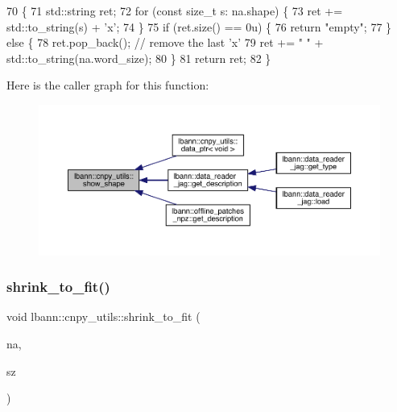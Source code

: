 \begin{DoxyCode}
70                                              \{
71   std::string ret;
72   \textcolor{keywordflow}{for} (\textcolor{keyword}{const} \textcolor{keywordtype}{size\_t} s: na.shape) \{
73     ret += std::to\_string(s) + \textcolor{charliteral}{'x'};
74   \}
75   \textcolor{keywordflow}{if} (ret.size() == 0u) \{
76     \textcolor{keywordflow}{return} \textcolor{stringliteral}{"empty"};
77   \} \textcolor{keywordflow}{else} \{
78     ret.pop\_back(); \textcolor{comment}{// remove the last 'x'}
79     ret += \textcolor{stringliteral}{" "} + std::to\_string(na.word\_size);
80   \}
81   \textcolor{keywordflow}{return} ret;
82 \}
\end{DoxyCode}
Here is the caller graph for this function\+:\nopagebreak
\begin{figure}[H]
\begin{center}
\leavevmode
\includegraphics[width=350pt]{namespacelbann_1_1cnpy__utils_a120e5719167d6d20b2a98c4282fd7a50_icgraph}
\end{center}
\end{figure}
\mbox{\label{namespacelbann_1_1cnpy__utils_ab19ad0a361570b7e78e203c02d6ba13a}} 
\subsubsection{\texorpdfstring{shrink\+\_\+to\+\_\+fit()}{shrink\_to\_fit()}}
{\footnotesize\ttfamily void lbann\+::cnpy\+\_\+utils\+::shrink\+\_\+to\+\_\+fit (\begin{DoxyParamCaption}\item[{cnpy\+::\+Npy\+Array \&}]{na,  }\item[{size\+\_\+t}]{sz }\end{DoxyParamCaption})}

